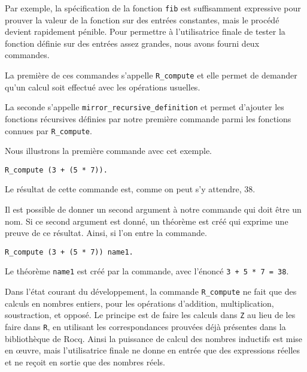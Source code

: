 \documentclass{modjflart}
\begin{document}
Par exemple, la spécification de la fonction \texttt{fib} est
suffisamment expressive pour prouver la valeur de la fonction sur des
entrées constantes, mais le procédé devient rapidement pénible.  Pour
permettre à l'utilisatrice finale de tester la fonction définie sur des
entrées assez grandes, nous avons fourni deux commandes.

La première de ces commandes s'appelle \texttt{R\_compute} et elle
permet de demander qu'un calcul soit effectué avec les opérations
usuelles.

La seconde s'appelle \texttt{mirror\_recursive\_definition}
et permet d'ajouter les fonctions récursives définies par notre
première commande parmi les fonctions connues par \texttt{R\_compute}.

Nous illustrons la première commande avec cet exemple.
\begin{verbatim}
R_compute (3 + (5 * 7)).
\end{verbatim}
Le résultat de cette commande est, comme on peut s'y attendre, 38.

Il est possible de donner un second argument à notre commande qui doit
être un nom.  Si ce second argument est donné, un théorème est créé
qui exprime une preuve de ce résultat.  Ainsi, si l'on entre la
commande.
\begin{verbatim}
R_compute (3 + (5 * 7)) name1.
\end{verbatim}
Le théorème \texttt{name1} est créé par la commande, avec l'énoncé \texttt{3
  + 5 * 7 = 38}.

Dans l'état courant du développement, la commande \texttt{R\_compute}
ne fait que des calculs en nombres entiers, pour les opérations
d'addition, multiplication, soustraction, et opposé.  Le principe est
de faire les calculs dans \texttt{Z} au lieu de les faire dans \texttt{R},
en utilisant les correspondances prouvées déjà présentes dans la
bibliothèque de Rocq.  Ainsi la puissance de calcul des nombres
inductifs est mise en œuvre, mais l'utilisatrice finale ne donne en
entrée que des expressions réelles et ne reçoit en sortie que des
nombres réels.
\end{document}
